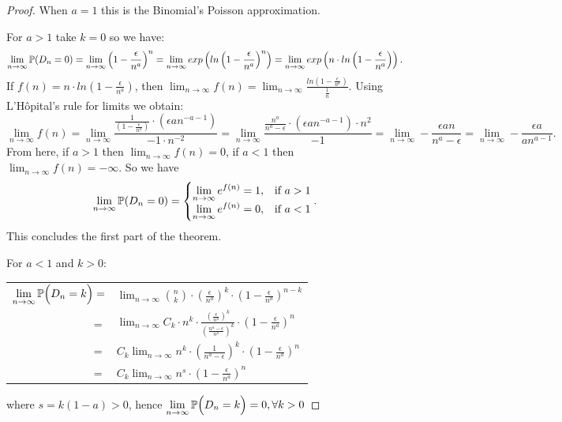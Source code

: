 \begin{proof}
When $a=1$ this is the Binomial's Poisson approximation.

For $a>1$ take $k=0$ so we have:
$$\displaystyle\lim_{n\to \infty} \P(D_n = 0) = \displaystyle\lim_{n\to \infty } \left( 1 - \frac{\epsilon}{n^a}\right)^n = \displaystyle\lim_{n\to \infty} exp\left( ln \left( 1 - \frac{\epsilon}{n^a}\right)^n\right) = \displaystyle\lim_{n\to \infty} exp\left(n \cdot ln \left( 1 - \frac{\epsilon}{n^a}\right)\right).$$
If $f(n)=  n \cdot ln \left( 1 - \frac{\epsilon}{n^a}\right)$, then $\displaystyle\lim_{n\to \infty} f(n) = \displaystyle\lim_{n\to \infty}\frac{ln \left( 1 - \frac{\epsilon}{n^a}\right)}{\frac{1}{n}}$. Using L’H\^{o}pital’s rule for limits we obtain:
$$\displaystyle\lim_{n\to \infty } f(n) = 
\displaystyle\lim_{n\to \infty } \frac{\frac{1}{\left( 1 - \frac{\epsilon}{n^a}\right)}\cdot (\epsilon a n^{-a-1})}
{-1\cdot n^{-2}} = 
\displaystyle\lim_{n\to \infty } \frac{\frac{n^a}{n^{a} - \epsilon}\cdot (\epsilon a n^{-a-1}) \cdot {n^{2}}}{-1} = 
\displaystyle\lim_{n\to \infty } - \frac{\epsilon a n}{n^{a} - \epsilon} =
\displaystyle\lim_{n\to \infty } - \frac{\epsilon a}{a n^{a-1}}
.$$
From here, if $a>1$ then $\displaystyle\lim_{n\to \infty } f(n) = 0$, if $a<1$ then $\displaystyle\lim_{n\to \infty } f(n) = -\infty$. So we have
$$ \displaystyle\lim_{n\to \infty} \P(D_n=0) = \begin{cases} 
\displaystyle\lim_{n\to \infty}e^{f(n)} = 1, & \mbox{if } a>1 \\ 
\displaystyle\lim_{n\to \infty}e^{f(n)} = 0, & \mbox{if } a<1 \end{cases}.$$
This concludes the first part of the theorem. 

For $a<1$ and $k>0$:
\begin{center}
\begin{tabular}{ r l }
 $\displaystyle\lim_{n\to \infty } \P\Big(D_n=k\Big) =$ & $\displaystyle\lim_{n\to \infty} \binom{n}{k} \cdot \left( \frac{\epsilon}{n^a} \right)^k \cdot \left( 1-\frac{\epsilon}{n^a}\right)^{n-k}$ \\
$=$ &  $\displaystyle\lim_{n\to \infty} C_{k}\cdot n^k\cdot  \frac{\left(\frac{\epsilon}{n^a}\right)^k} {\left(\frac{n^a - \epsilon}{n^a}\right)^k} \cdot \left(1-\frac{\epsilon}{n^a}\right)^{n} $\\
$=$ &  $C_{k}\displaystyle\lim_{n\to \infty} n^k \cdot \left(\frac{1} {n^a - \epsilon}\right)^k \cdot \left(1-\frac{\epsilon}{n^a}\right)^{n} $\\
$=$ &  $C_{k} \displaystyle\lim_{n\to \infty}  n^s\cdot \left(1-\frac{\epsilon}{n^a}\right)^{n}$\\
\end{tabular}
\end{center}

where $s=k(1-a)>0$, hence $\displaystyle\lim_{n\to \infty } \P\Big(D_n=k\Big) = 0, \forall k>0 \qedhere$ 

\end{proof}

